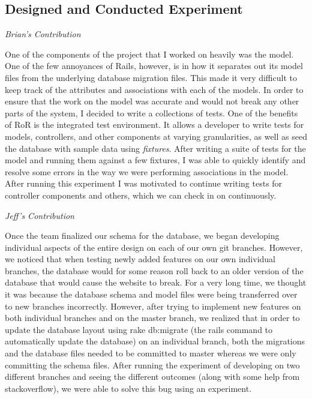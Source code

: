 \documentclass[11pt]{article}
\begin{document}
\subsection{Designed and Conducted Experiment}

\textit{Brian's Contribution}

One of the components of the project that I worked on heavily was the model. One of the few annoyances of Rails, however, is in how it separates out its model files from the underlying database migration files. This made it very difficult to keep track of the attributes and associations with each of the models. In order to ensure that the work on the model was accurate and would not break any other parts of the system, I decided to write a collections of tests. One of the benefits of RoR is the integrated test environment. It allows a developer to write tests for models, controllers, and other components at varying granularities, as well as seed the database with sample data using \textit{fixtures}. After writing a suite of tests for the model and running them against a few fixtures, I was able to quickly identify and resolve some errors in the way we were performing associations in the model. After running this experiment I was motivated to continue writing tests for controller components and others, which we can check in on continuously. 

\textit{Jeff's Contribution}

Once the team finalized our schema for the database, we began developing individual aspects of the entire design on each of our own git branches.  However, we noticed that when testing newly added features on our own individual branches, the database would for some reason roll back to an older version of the database that would cause the website to break.  For a very long time, we thought it was because the database schema and model files were being transferred over to new branches incorrectly.  However, after trying to implement new features on both individual branches and on the master branch, we realized that in order to update the database layout using rake db:migrate (the rails command to automatically update the database) on an individual branch, both the migrations and the database files needed to be committed to master whereas we were only committing the schema files.  After running the experiment of developing on two different branches and seeing the different outcomes (along with some help from stackoverflow), we were able to solve this bug using an experiment.
\end{document}
